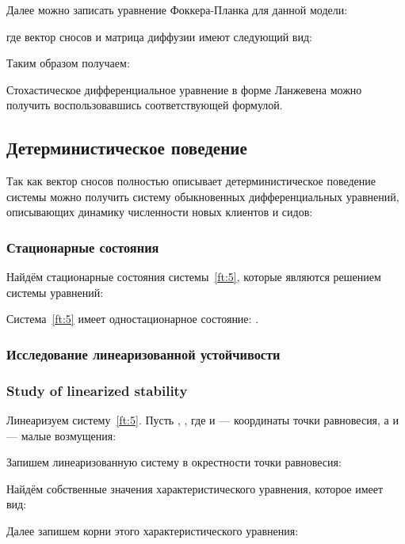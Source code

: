 \documentclass[floatfix,
showkeys,
twocolumn, nofootinbib, superscriptaddress, ]{revtex4-1}
\begin{document}
  Далее можно записать уравнение Фоккера-Планка для данной модели:

  где вектор сносов и матрица диффузии имеют следующий вид:



  Таким образом получаем:


  Стохастическое дифференциальное уравнение в форме Ланжевена можно
  получить воспользовавшись соответствующей формулой.

  \subsection{Детерминистическое поведение}

  Так как вектор сносов  полностью описывает детерминистическое
  поведение системы можно получить систему обыкновенных
  дифференциальных уравнений, описывающих динамику численности новых
  клиентов и сидов:



  \subsubsection{Стационарные состояния}

  Найдём стационарные состояния системы~\eqref{ft:5}, которые
  являются решением системы уравнений:



  Система~\eqref{ft:5} имеет одностационарное состояние:
.

  \subsubsection{Исследование линеаризованной устойчивости}
  \subsubsection{Study of linearized stability}

  Линеаризуем систему~\eqref{ft:5}. Пусть ,
  , где  и  --- координаты точки
  равновесия, а  и  --- малые возмущения:


  Запишем линеаризованную систему в окрестности точки равновесия:


  Найдём собственные значения характеристического уравнения, которое
  имеет вид:



  Далее запишем корни этого характеристического уравнения:
\end{document}
